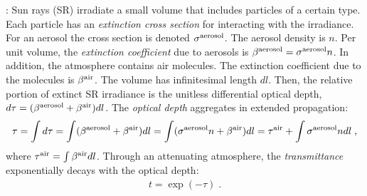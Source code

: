 \documentclass[10pt,letterpaper]{article}
\begin{document}

: Sun rays (SR) irradiate a small volume
that includes particles of a certain type.  Each particle has an {\em
  extinction cross section} for interacting with the irradiance. For
an aerosol the cross section is denoted $\sigma^{\rm aerosol}$.  The
aerosol density is $n$. Per unit volume, the {\em extinction
  coefficient} due to aerosols is $\beta^{\rm aerosol}= \sigma^{\rm
  aerosol} n$. In addition, the atmosphere contains air molecules.
The extinction coefficient due to the molecules is $\beta^{\rm air}$.
The volume has infinitesimal length $dl$. Then, the relative portion
of extinct SR irradiance is the unitless differential optical depth,
$d\tau= (\beta^{\rm aerosol}+\beta^{\rm air}) dl$.  The {\em optical
  depth} aggregates in extended propagation:
\begin{align}
  \tau= \int d\tau=\int (\beta^{\rm aerosol}+\beta^{\rm air}) dl =\int
  (\sigma^{\rm aerosol} n +\beta^{\rm air}) dl = \tau^{\rm air}+ \int
  \sigma^{\rm aerosol} n dl \;,
  \label{eq:tau}
\end{align}
where $\tau^{\rm air}=\int \beta^{\rm air} dl$.  Through an
attenuating atmosphere, the {\em transmittance} exponentially decays
with the optical depth:
\begin{align}
  t=\exp(-\tau) \;.
  \label{eq:beer-lambert}
\end{align}
\end{document}
